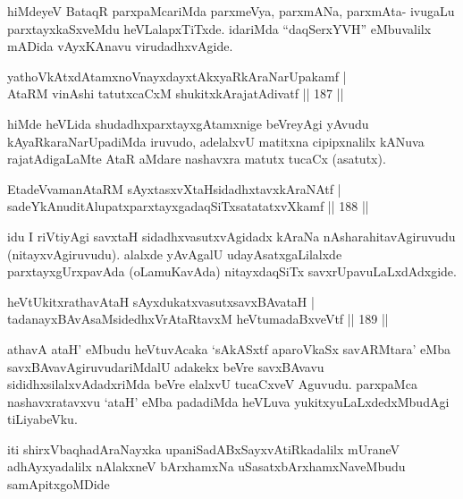 \begin{artha}
hiMdeyeV BataqR parxpaMcariMda parxmeVya, parxmANa, parxmAta- ivugaLu parxtayxkaSxveMdu heVLalapxTiTxde. idariMda ``daqSerxYVH'' eMbuvalilx mADida vAyxKAnavu virudadhxvAgide.
\end{artha}

\begin{shl}
yathoVkAtxdAtamxnoV\s nayxdayxtAkxyaRkAraNarUpakamf |\\
AtaRM vinAshi tatutxcaCxM shukitxkArajatAdivatf \hfill || 187 ||
\end{shl}

\begin{artha}
hiMde heVLida shudadhxparxtayxgAtamxnige beVreyAgi yAvudu kAyaRkaraNarUpadiMda iruvudo, adelalxvU matitxna cipipxnalilx kANuva rajatAdigaLaMte AtaR aMdare nashavxra matutx tucaCx (asatutx).
\end{artha}

\begin{shl}
EtadeVvamanAtaRM sAyxtasxvXtaHsidadhxtavxkAraNAtf |\\
sadeYkAnuditAlupatxparxtayxgadaqSiTxsatatatxvXkamf \hfill || 188 ||
\end{shl}

\begin{artha}
idu I riVtiyAgi savxtaH sidadhxvasutxvAgidadx kAraNa nAsharahitavAgiruvudu (nitayxvAgiruvudu). alalxde yAvAgalU udayAsatxgaLilalxde parxtayxgUrxpavAda (oLamuKavAda) nitayxdaqSiTx savxrUpavuLaLxdAdxgide.
\end{artha}


\begin{shl}
heVtUkitxrathavA\s taH sAyxdukatxvasutxsavxBAvataH |\\
tadanayxBAvAsaMsidedhxVrAtaRtavxM heVtumadaBxveVtf \hfill || 189 ||
\end{shl}

\begin{artha}
athavA ataH' eMbudu heVtuvAcaka `sAkASxtf aparoVkaSx savARMtara' eMba savxBAvavAgiruvudariMdalU adakekx beVre savxBAvavu sididhxsilalxvAdadxriMda beVre elalxvU tucaCxveV Aguvudu. parxpaMca nashavxratavxvu `ataH' eMba padadiMda heVLuva yukitxyuLaLxdedxMbudAgi tiLiyabeVku.
\end{artha}

\begin{center}
iti shirxVbaqhadAraNayxka upaniSadABxSayxvAtiRkadalilx mUraneV adhAyxyadalilx nAlakxneV bArxhamxNa uSasatxbArxhamxNaveMbudu samApitxgoMDide 

\end{center}
